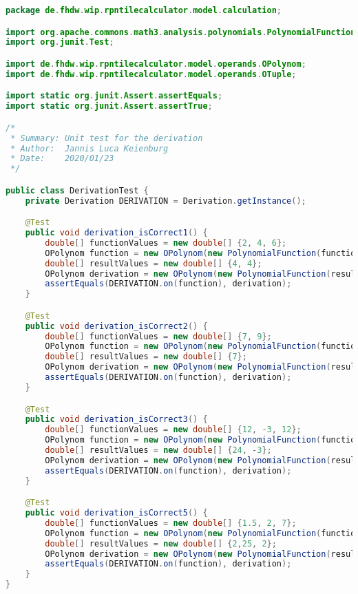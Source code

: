 \begin{lstlisting}[caption=DerivationTest (Keienburg),label=list:DerivationTest,language=Java]
package de.fhdw.wip.rpntilecalculator.model.calculation;

import org.apache.commons.math3.analysis.polynomials.PolynomialFunction;
import org.junit.Test;

import de.fhdw.wip.rpntilecalculator.model.operands.OPolynom;
import de.fhdw.wip.rpntilecalculator.model.operands.OTuple;

import static org.junit.Assert.assertEquals;
import static org.junit.Assert.assertTrue;

/*
 * Summary: Unit test for the derivation
 * Author:  Jannis Luca Keienburg
 * Date:    2020/01/23
 */

public class DerivationTest {
    private Derivation DERIVATION = Derivation.getInstance();

    @Test
    public void derivation_isCorrect1() {
        double[] functionValues = new double[] {2, 4, 6};
        OPolynom function = new OPolynom(new PolynomialFunction(functionValues));
        double[] resultValues = new double[] {4, 4};
        OPolynom derivation = new OPolynom(new PolynomialFunction(resultValues));
        assertEquals(DERIVATION.on(function), derivation);
    }

    @Test
    public void derivation_isCorrect2() {
        double[] functionValues = new double[] {7, 9};
        OPolynom function = new OPolynom(new PolynomialFunction(functionValues));
        double[] resultValues = new double[] {7};
        OPolynom derivation = new OPolynom(new PolynomialFunction(resultValues));
        assertEquals(DERIVATION.on(function), derivation);
    }

    @Test
    public void derivation_isCorrect3() {
        double[] functionValues = new double[] {12, -3, 12};
        OPolynom function = new OPolynom(new PolynomialFunction(functionValues));
        double[] resultValues = new double[] {24, -3};
        OPolynom derivation = new OPolynom(new PolynomialFunction(resultValues));
        assertEquals(DERIVATION.on(function), derivation);
    }

    @Test
    public void derivation_isCorrect5() {
        double[] functionValues = new double[] {1.5, 2, 7};
        OPolynom function = new OPolynom(new PolynomialFunction(functionValues));
        double[] resultValues = new double[] {2,25, 2};
        OPolynom derivation = new OPolynom(new PolynomialFunction(resultValues));
        assertEquals(DERIVATION.on(function), derivation);
    }
}
\end{lstlisting} 

